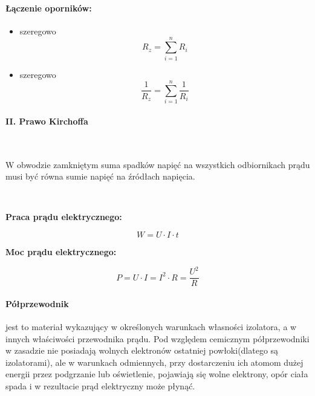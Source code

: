 \documentclass{article}
\begin{document}
            \paragraph{Łączenie oporników:}
            \begin{itemize}
                \item szeregowo
                \begin{equation}
                    R_{z} = \sum\limits_{i = 1}^n R_i
                \end{equation}

                \item szeregowo
                \begin{equation}
                    \frac{1}{R_{z}} =  \sum\limits_{i = 1}^n \frac{1}{R_i}
                \end{equation}
            \end{itemize}
            
            \paragraph{II. Prawo Kirchoffa}
            
            \
            
            W obwodzie zamkniętym suma spadków napięć na wszystkich
            odbiornikach prądu musi być równa sumie napięć na źródłach
            napięcia.

            \
            

            \textbf{Praca prądu elektrycznego:}

            \begin{equation}
                W = U \cdotp I \cdotp t
            \end{equation}

            \textbf{Moc prądu elektrycznego:}
            
            \begin{equation}
                P = U \cdotp I = I^2 \cdotp R = \frac{U^2}{R}
            \end{equation}

            \paragraph{Półprzewodnik}
            jest to materiał wykazujący w określonych warunkach
            własności izolatora, a w innych właściwości przewodnika prądu.
            Pod względem cemicznym półprzewodniki w zasadzie nie posiadają
            wolnych elektronów ostatniej powłoki(dlatego są izolatorami),
            ale w warunkach odmiennych, przy dostarczeniu ich atomom
            dużej energii przez podgrzanie lub oświetlenie, pojawiają się
            wolne elektrony, opór ciała spada i w rezultacie prąd elektryczny
            może płynąć.
\end{document}
